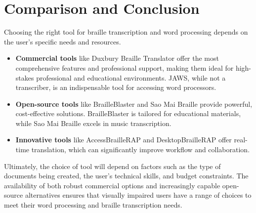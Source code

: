 \section{Comparison and Conclusion}\label{ch12:sec:conclusion}
Choosing the right tool for braille transcription and word processing depends on the user's specific needs and resources.
\begin{itemize}
	\item \textbf{Commercial tools} like Duxbury Braille Translator offer the most comprehensive features and professional support, making them ideal for high-stakes professional and educational environments. JAWS, while not a transcriber, is an indispensable tool for accessing word processors.
	\item \textbf{Open-source tools} like BrailleBlaster and Sao Mai Braille provide powerful, cost-effective solutions. BrailleBlaster is tailored for educational materials, while Sao Mai Braille excels in music transcription.
	\item \textbf{Innovative tools} like AccessBrailleRAP and DesktopBrailleRAP offer real-time translation, which can significantly improve workflow and collaboration.
\end{itemize}
Ultimately, the choice of tool will depend on factors such as the type of documents being created, the user's technical skills, and budget constraints. The availability of both robust commercial options and increasingly capable open-source alternatives ensures that visually impaired users have a range of choices to meet their word processing and braille transcription needs.
